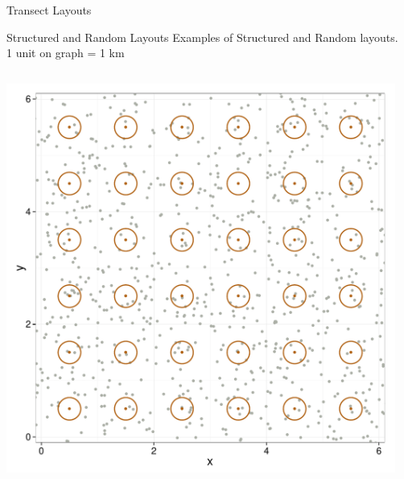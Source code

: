 \documentclass{beamer}
\begin{document}
\begin{frame}{Transect Layouts}
\end{frame}

\begin{frame}{Structured and Random Layouts}
Examples of Structured and Random layouts.\\
1 unit on graph = 1 km
	\begin{columns}
		\begin{column}{0.48\textwidth}
			\includegraphics[width=\textwidth]{../images/slides-layoutS.pdf}
		\end{column}
		\begin{column}{0.48\textwidth}

\end{column}
\end{columns}
\end{frame}
\end{document}
